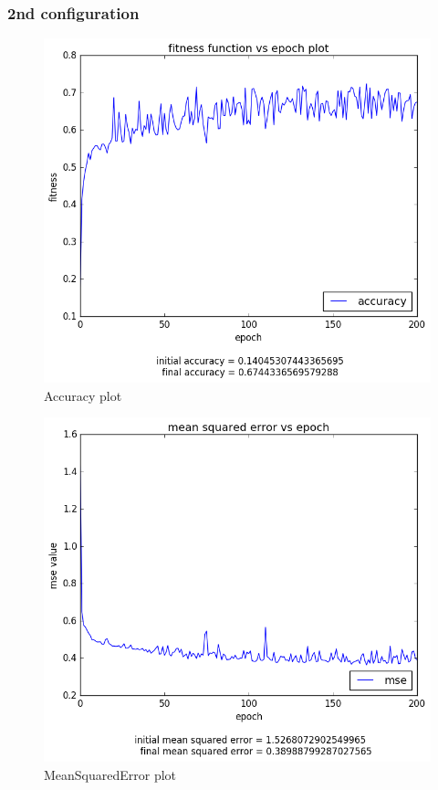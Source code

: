 \documentclass[12pt,a4paper]{article}
\begin{document}
\subsubsection{2nd configuration}
\begin{figure}[H]
\centering
\includegraphics[scale=0.4]{img/20_acc_2.png}
\caption{Accuracy plot}
\end{figure}
\begin{figure}[H]
\centering
\includegraphics[scale=0.4]{img/20_mse_2.png}
\caption{MeanSquaredError plot}
\end{figure}
\end{document}
